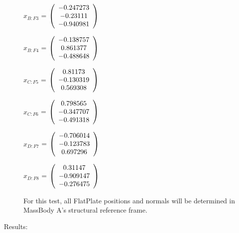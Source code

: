 \begin{description}
$\hat{x}_{B:F3}$ = $\left( \begin{array} {ccc}  -0.247273 \\   -0.23111 \\  -0.940981
\end{array} \right)\\ \\$

$\hat{x}_{B:F4}$ = $\left( \begin{array} {ccc}  -0.138757 \\   0.861377 \\  -0.488648
\end{array} \right)\\ \\$

$\hat{x}_{C:F5}$ = $\left( \begin{array} {ccc}    0.81173 \\  -0.130319 \\   0.569308
\end{array} \right)\\ \\$

$\hat{x}_{C:F6}$ = $\left( \begin{array} {ccc}   0.798565 \\  -0.347707 \\  -0.491318
\end{array} \right)\\ \\$

$\hat{x}_{D:F7}$ = $\left( \begin{array} {ccc}  -0.706014 \\  -0.123783 \\   0.697296
\end{array} \right)\\ \\$

$\hat{x}_{D:F8}$ = $\left( \begin{array} {ccc}    0.31147 \\  -0.909147 \\  -0.276475
\end{array} \right)\\ \\$

For this test, all FlatPlate positions and normals will be determined in
MassBody A's structural reference frame.

\item[Results:] \ \newline


\end{description}
